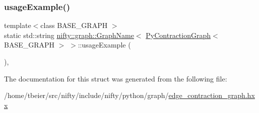 \subsubsection{\texorpdfstring{usage\+Example()}{usageExample()}}
{\footnotesize\ttfamily template$<$class B\+A\+S\+E\+\_\+\+G\+R\+A\+PH $>$ \\
static std\+::string \hyperlink{structnifty_1_1graph_1_1GraphName}{nifty\+::graph\+::\+Graph\+Name}$<$ \hyperlink{namespacenifty_1_1graph_aa9ab054f2ea0df09d60d6adf1c7ee6b3}{Py\+Contraction\+Graph}$<$ B\+A\+S\+E\+\_\+\+G\+R\+A\+PH $>$ $>$\+::usage\+Example (\begin{DoxyParamCaption}{ }\end{DoxyParamCaption})\hspace{0.3cm}{\ttfamily [inline]}, {\ttfamily [static]}}



The documentation for this struct was generated from the following file\+:\begin{DoxyCompactItemize}
\item 
/home/tbeier/src/nifty/include/nifty/python/graph/\hyperlink{python_2graph_2edge__contraction__graph_8hxx}{edge\+\_\+contraction\+\_\+graph.\+hxx}\end{DoxyCompactItemize}
